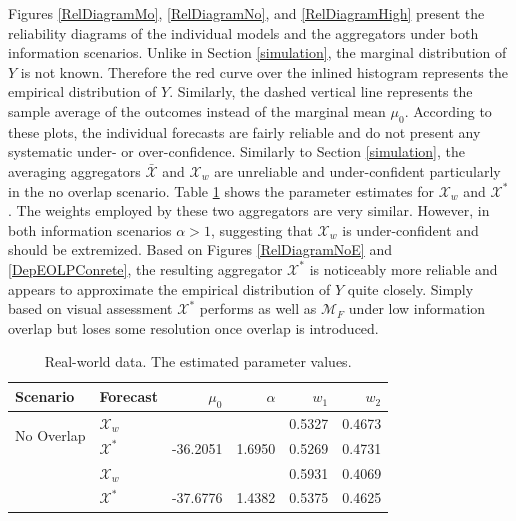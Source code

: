 \documentclass[11pt]{article}
\theoremstyle{definition}
\theoremstyle{definition}
\begin{document}
Figures \ref{RelDiagramMo}, \ref{RelDiagramNo}, and \ref{RelDiagramHigh} present the reliability diagrams of the individual models and the aggregators under both information scenarios. Unlike in Section \ref{simulation}, the marginal distribution of $Y$ is not known. Therefore the red curve over the inlined histogram represents the empirical distribution of $Y$. Similarly, the dashed vertical line represents the sample average of the outcomes instead of the marginal mean $\mu_0$. According to these plots, the individual forecasts are fairly reliable and do not present any systematic under- or over-confidence. Similarly to Section \ref{simulation}, the averaging aggregators $\bar{\mathcal{X}}$ and $\mathcal{X}_w$ are  unreliable and under-confident particularly in the no overlap scenario. Table \ref{NoParamsReal} shows the parameter estimates for $\mathcal{X}_w$ and $\mathcal{X}^*$. The weights employed by these two aggregators are very similar. However, in both information scenarios $\alpha > 1$, suggesting that $\mathcal{X}_w$ is under-confident and should be extremized. Based on Figures \ref{RelDiagramNoE} and  \ref{DepEOLPConrete}, the resulting aggregator $\mathcal{X}^*$ is noticeably more reliable and appears to approximate the empirical distribution of $Y$ quite closely. Simply based on visual assessment $\mathcal{X}^*$ performs as well as $\mathcal{M}_F$ under low information overlap but  loses some resolution once  overlap is introduced. 

\begin{table}[ht]
\centering
\caption{Real-world data. The estimated parameter values.} 
\begin{tabular}{llrrrr}
   \hline \hline
Scenario & Forecast & $\mu_0$ & $\alpha$ & $w_1$ & $w_2$\\
  \hline
\multirow{2}{*}{No Overlap} & $\mathcal{X}_w$ &  &  & 0.5327 & 0.4673 \\ 
&  $\mathcal{X}^*$ & -36.2051 & 1.6950 & 0.5269 & 0.4731 \\  \rule{0pt}{2.9ex} 
\hspace{-0.2em}\multirow{2}{*}{High Overlap}  & $\mathcal{X}_w$ &  &  & 0.5931 & 0.4069 \\ 
 & $\mathcal{X}^*$ & -37.6776 & 1.4382 & 0.5375 & 0.4625 \\ 
   \hline
\end{tabular}
\label{NoParamsReal}
\end{table}
\end{document}
